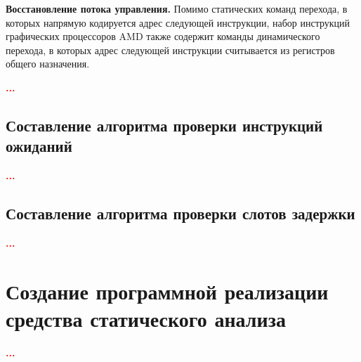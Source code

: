 \documentclass[a4paper,14pt]{extarticle}
\newcommand{\todo}[1]{\textbf{\textcolor{red}{#1}}}
\newcommand{\topic}[2]{\textbf{#1.} #2\newline}
\begin{document}
\topic{Восстановление потока управления}{Помимо статических команд перехода, в которых напрямую
кодируется адрес следующей инструкции, набор инструкций графических процессоров AMD также содержит
команды динамического перехода, в которых адрес следующей инструкции считывается из регистров
общего назначения.

\todo{...}}

\subsection{Составление алгоритма проверки инструкций ожиданий}

\todo{...}

\subsection{Составление алгоритма проверки слотов задержки}

\todo{...}

\section{Создание программной реализации средства статического анализа}

\todo{...}

\newpage
{}
{}
\printbibliography[title={СПИСОК ИСТОЧНИКОВ}]
\end{document}

